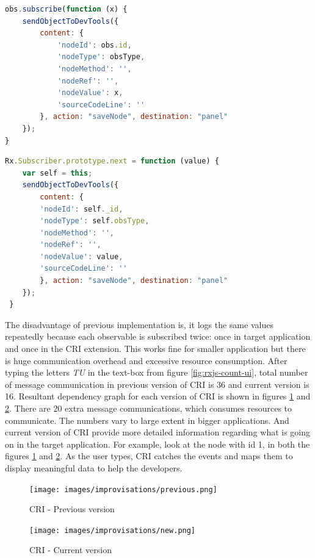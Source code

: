 \begin{lstlisting}[language=JavaScript, caption=Previous implementation, label={lst:prev-cri-code}]
obs.subscribe(function (x) {
	sendObjectToDevTools({
		content: {
			'nodeId': obs.id,
			'nodeType': obsType,
			'nodeMethod': '',
			'nodeRef': '',
			'nodeValue': x,
			'sourceCodeLine': ''
		}, action: "saveNode", destination: "panel"
	});
}
\end{lstlisting}
\begin{lstlisting}[language=JavaScript, caption=Current implementation, label={lst:curr-cri-code}]
 Rx.Subscriber.prototype.next = function (value) {
 	var self = this;
 	sendObjectToDevTools({
	 	content: {
	 	'nodeId': self._id,
	 	'nodeType': self.obsType,
	 	'nodeMethod': '',
	 	'nodeRef': '',
	 	'nodeValue': value,
	 	'sourceCodeLine': ''
	 	}, action: "saveNode", destination: "panel"
 	});
 }
\end{lstlisting}

The disadvantage of previous implementation is, it logs the same values repeatedly because each observable is subscribed twice: once in target application and once in the CRI extension. This works fine for smaller application but there is huge communication overhead and excessive resource consumption. After typing the letters \textit{TU} in the text-box from figure \ref{fig:rxjs-count-ui}, total number of message communication in previous version of CRI is 36 and current version is 16. Resultant dependency graph for each version of CRI is shown in figures \ref{fig:prev-cri} and \ref{fig:curr-cri}.
There are 20 extra message communications, which consumes resources to communicate. The numbers vary to large extent in bigger applications. And current version of CRI provide more detailed information regarding what is going on in the target application. For example, look at the node with id 1, in both the figures \ref{fig:prev-cri} and \ref{fig:curr-cri}. As the user types, CRI catches the events and maps them to display meaningful data to help the developers. 

\begin{figure}[!h]
	\centering
	\texttt{[image: images/improvisations/previous.png]}
	\caption{CRI - Previous version}
	\label{fig:prev-cri}
\end{figure}
\begin{figure}[!h]
	\centering
	\texttt{[image: images/improvisations/new.png]}
	\caption{CRI - Current version}
	\label{fig:curr-cri}
\end{figure}

